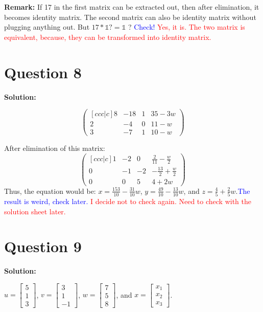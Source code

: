 \documentclass[11pt]{article} %
\begin{document}
\textbf{Remark:} If 17 in the first matrix can be extracted out, then after elimination, it becomes identity matrix. The second matrix can also be identity matrix without plugging anything out. But $17*\mathbb{1}?=\mathbb{1}$ ? \textcolor{blue}{Check!} \textcolor{red}{Yes, it is. The two matrix is equivalent, because, they can be transformed into identity matrix. }

\section{Question 8}
\textbf{Solution:}

$$\begin{pmatrix}[ccc|c]
	8&-18&1&35-3w\\
	2&-4&0&11-w\\
	3&-7&1&10-w
\end{pmatrix}$$

After elimination of this matrix:
$$\begin{pmatrix}[ccc|c]
	1&-2&0&\frac{2}{11}-\frac{w}{2}\\
	0&-1&-2&-\frac{13}{2}+\frac{w}{2}\\
	0&0&5&4+2w
\end{pmatrix}$$
	Thus, the equation would be: $x=\frac{153}{10}-\frac{31}{10}w$, $y=\frac{49}{10}-\frac{13}{10}w$, and $z=\frac{4}{5}+\frac{2}{5}w$.\textcolor{blue}{The result is weird, check later. }\textcolor{red}{I decide not to check again. Need to check with the solution sheet later.}
	
\section{Question 9}
\textbf{Solution:}

$u=
\begin{bmatrix}
	5\\
	1\\
	3
\end{bmatrix}$, $v=
\begin{bmatrix}
	3\\1\\-1
\end{bmatrix}$, $w=
\begin{bmatrix}
	7\\5\\8
\end{bmatrix}$, and $x=
\begin{bmatrix}
	x_1\\x_2\\x_3
\end{bmatrix}$. 
\end{document}
